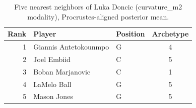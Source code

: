 \begin{table}[htbp]
  \centering\small
  \begin{tabular}{rllc}
    \toprule
    Rank & Player & Position & Archetype \\
    \midrule
    1 & Giannis Antetokounmpo & G & 4 \\
    2 & Joel Embiid & C & 5 \\
    3 & Boban Marjanovic & C & 1 \\
    4 & LaMelo Ball & G & 5 \\
    5 & Mason Jones & G & 5 \\
    \bottomrule
  \end{tabular}
  \caption{Five nearest neighbors of Luka Doncic (curvature_m2 modality), Procrustes-aligned posterior mean.}
  \label{tab:Luka_Doncic_neighbors_curvature_m2}
\end{table}

